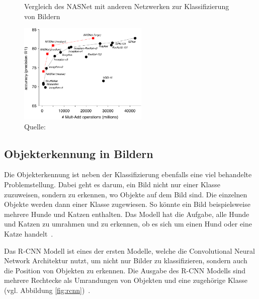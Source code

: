 \begin{figure}[h]
    \captionsetup{width=.9\linewidth}
    \caption{Vergleich des NASNet mit anderen Netzwerken zur Klassifizierung von Bildern}
    \label{nasnet-comparision}
    \centering
    \includegraphics[width=0.55\textwidth]{graphics/nasnet-comparision.jpg}
    \caption*{Quelle: \textcite{GoogleNasNet}}
\end{figure}

\subsection{Objekterkennung in Bildern}
\label{chap:object-detection}

Die Objekterkennung ist neben der Klassifizierung ebenfalls eine viel behandelte Problemstellung. Dabei geht es darum, ein Bild nicht nur einer Klasse zuzuweisen, sondern zu erkennen, wo Objekte auf dem Bild sind. Die einzelnen Objekte werden dann einer Klasse zugewiesen. So könnte ein Bild beispielsweise mehrere Hunde und Katzen enthalten. Das Modell hat die Aufgabe, alle Hunde und Katzen zu umrahmen und zu erkennen, ob es sich um einen Hund oder eine Katze handelt~\autocite{Goodfellow2016}.

Das R-CNN Modell ist eines der ersten Modelle, welche die Convolutional Neural Network Architektur nutzt, um nicht nur Bilder zu klassifizieren, sondern auch die Position von Objekten zu erkennen. Die Ausgabe des R-CNN Modells sind mehrere Rechtecke als Umrandungen von Objekten und eine zugehörige Klasse (vgl. Abbildung \ref{fig:rcnn})~\autocite{SSD}.

